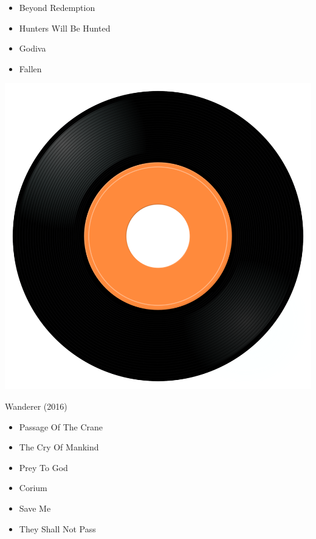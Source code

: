 \begin{minipage}[t]{0.25\textwidth}\vspace{0pt}
\begin{itemize}[nosep,leftmargin=1em,labelwidth=*,align=left]
	\setlength{\itemsep}{0pt}
	\item Beyond Redemption
	\item Hunters Will Be Hunted
	\item Godiva
	\item Fallen
\end{itemize}
\end{minipage}
\begin{minipage}[t]{0.25\textwidth}
\captionsetup{type=figure}
\includegraphics[width=\textwidth]{Images/cover.png}
\caption*{Wanderer (2016)}
\end{minipage}
\begin{minipage}[t]{0.25\textwidth}\vspace{0pt}
\begin{itemize}[nosep,leftmargin=1em,labelwidth=*,align=left]
	\setlength{\itemsep}{0pt}
	\item Passage Of The Crane
	\item The Cry Of Mankind
	\item Prey To God
	\item Corium
	\item Save Me
	\item They Shall Not Pass
\end{itemize}
\end{minipage}

